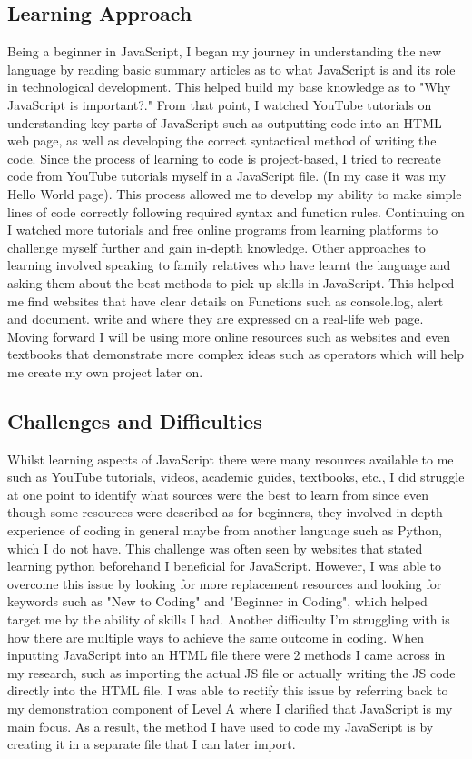 \documentclass[a4paper, 11pt]{report}
\begin{document}
\subsection{Learning Approach}
Being a beginner in JavaScript, I began my journey in understanding the new language by reading basic summary articles as to what JavaScript is and its role in technological development.  This helped build my base knowledge as to "Why JavaScript is important?." From that point, I watched YouTube tutorials on understanding key parts of JavaScript such as outputting code into an HTML web page, as well as developing the correct syntactical method of writing the code. Since the process of learning to code is project-based, I tried to recreate code from YouTube tutorials myself in a JavaScript file. (In my case it was my Hello World page). This process allowed me to develop my ability to make simple lines of code correctly following required syntax and function rules. Continuing on I watched more tutorials and free online programs from learning platforms to challenge myself further and gain in-depth knowledge. Other approaches to learning involved speaking to family relatives who have learnt the language and asking them about the best methods to pick up skills in JavaScript. This helped me find websites that have clear details on Functions such as console.log, alert and document. write and where they are expressed on a real-life web page. Moving forward I will be using more online resources such as websites and even textbooks that demonstrate more complex ideas such as operators which will help me create my own project later on.   

\subsection{Challenges and Difficulties}
Whilst learning aspects of JavaScript there were many resources available to me such as YouTube tutorials, videos, academic guides, textbooks, etc., I did struggle at one point to identify what sources were the best to learn from since even though some resources were described as for beginners, they involved in-depth experience of coding in general maybe from another language such as Python, which I do not have. This challenge was often seen by websites that stated learning python beforehand I beneficial for JavaScript. However, I was able to overcome this issue by looking for more replacement resources and looking for keywords such as "New to Coding" and "Beginner in Coding", which helped target me by the ability of skills I had. Another difficulty I'm struggling with is how there are multiple ways to achieve the same outcome in coding. When inputting JavaScript into an HTML file there were 2 methods I came across in my research, such as importing the actual JS file or actually writing the JS code directly into the HTML file. I was able to rectify this issue by referring back to my demonstration component of Level A where I clarified that JavaScript is my main focus. As a result, the method I have used to code my JavaScript is by creating it in a separate file that I can later import.
\end{document}
